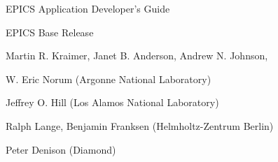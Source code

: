 EPICS Application Developer's Guide

EPICS Base Release 



Martin R. Kraimer, Janet B. Anderson, Andrew N. Johnson,

W. Eric Norum (Argonne National Laboratory)

Jeffrey O. Hill (Los Alamos National Laboratory)

Ralph Lange, Benjamin Franksen (Helmholtz-Zentrum Berlin)

Peter Denison (Diamond)








